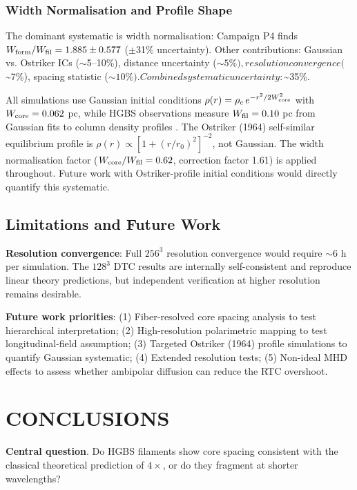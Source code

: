 \documentclass[twocolumn,usenatbib]{mnras}
\begin{document}
\subsubsection{Width Normalisation and Profile Shape}

The dominant systematic is width normalisation: Campaign P4 finds $W_{\rm form}/W_{\rm fil} = 1.885 \pm 0.577$ ($\pm$31\% uncertainty). Other contributions: Gaussian vs. Ostriker ICs ($\sim$5--10\%), distance uncertainty ($\sim5\%), resolution convergence ($\sim7\%), spacing statistic ($\sim10\%). Combined systematic uncertainty: $\sim35\%.

All simulations use Gaussian initial conditions $\rho(r) = \rho_c\,e^{-r^2/2W_{\rm core}^2}$ with $W_{\rm core} = 0.062$ pc, while HGBS observations measure $W_{\rm fil} = 0.10$ pc from Gaussian fits to column density profiles \citep{Arzoumanian2011}. The Ostriker (1964) self-similar equilibrium profile is $\rho(r) \propto [1 + (r/r_0)^2]^{-2}$, not Gaussian. The width normalisation factor ($W_{\rm core}/W_{\rm fil} = 0.62$, correction factor 1.61) is applied throughout. Future work with Ostriker-profile initial conditions would directly quantify this systematic.

\subsection{Limitations and Future Work}

\textbf{Resolution convergence}: Full $256^3$ resolution convergence would require $\sim$6 h per simulation. The $128^3$ DTC results are internally self-consistent and reproduce linear theory predictions, but independent verification at higher resolution remains desirable.

\textbf{Future work priorities}: (1) Fiber-resolved core spacing analysis to test hierarchical interpretation; (2) High-resolution polarimetric mapping to test longitudinal-field assumption; (3) Targeted Ostriker (1964) profile simulations to quantify Gaussian systematic; (4) Extended resolution tests; (5) Non-ideal MHD effects to assess whether ambipolar diffusion can reduce the RTC overshoot.

\section{CONCLUSIONS}

\textbf{Central question}. Do HGBS filaments show core spacing consistent with the classical theoretical prediction of $4\times$, or do they fragment at shorter wavelengths?
\end{document}
